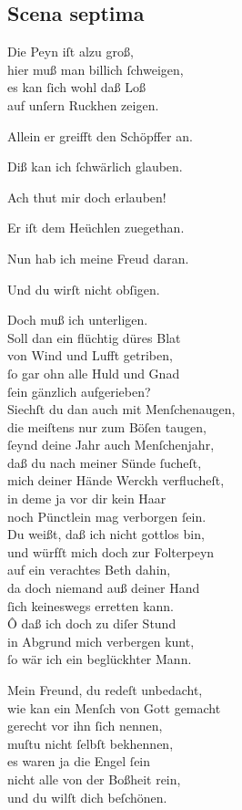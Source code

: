 \documentclass{ees}
\newenvironment{lyrics}[1]{%
  \subsection{#1}\nopagebreak%
  \begin{lyricslist}%
  \let\voice\item%
}{%
  \end{lyricslist}%
}
\begin{document}
\begin{lyrics}{Scena septima}
  \voice[Eliphas]
  Die Peyn iſt alzu groß,\\
  hier muß man billich ſchweigen,\\
  es kan ſich wohl daß Loß\\
  auf unſern Ruckhen zeigen.

  \voice[Jobs Frau]
  Allein er greifft den Schöpffer an.

  \voice[Eliphas]
  Diß kan ich ſchwärlich glauben.

  \voice[Job]
  Ach thut mir doch erlauben!

  \voice[Jobs Frau]
  Er iſt dem Heüchlen zuegethan.

  \voice[Leviathan]
  Nun hab ich meine Freud daran.

  \voice[Schöpffer]
  Und du wirſt nicht obſigen.

  \voice[Job]
  Doch muß ich unterligen.\\
  Soll dan ein flüchtig düres Blat\\
  von Wind und Lufft getriben,\\
  ſo gar ohn alle Huld und Gnad\\
  ſein gänzlich aufgerieben?\\
  Siechſt du dan auch mit Menſchenaugen,\\
  die meiſtens nur zum Böſen taugen,\\
  ſeynd deine Jahr auch Menſchenjahr,\\
  daß du nach meiner Sünde ſucheſt,\\
  mich deiner Hände Werckh verflucheſt,\\
  in deme ja vor dir kein Haar\\
  noch Pünctlein mag verborgen ſein.\\
  Du weißt, daß ich nicht gottlos bin,\\
  und würfſt mich doch zur Folterpeyn\\
  auf ein verachtes Beth dahin,\\
  da doch niemand auß deiner Hand\\
  ſich keineswegs erretten kann.\\
  Ô daß ich doch zu diſer Stund\\
  in Abgrund mich verbergen kunt,\\
  ſo wär ich ein beglückhter Mann.

  \voice[Eliphas]
  Mein Freund, du redeſt unbedacht,\\
  wie kan ein Menſch von Gott gemacht\\
  gerecht vor ihn ſich nennen,\\
  muſtu nicht ſelbſt bekhennen,\\
  es waren ja die Engel ſein\\
  nicht alle von der Boßheit rein,\\
  und du wilſt dich beſchönen.
\end{lyrics}
\end{document}

